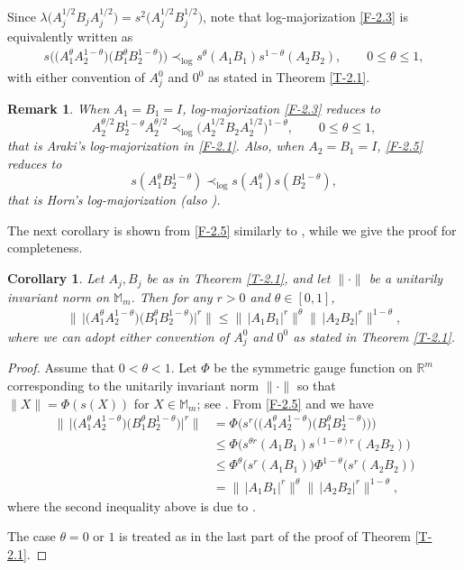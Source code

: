 \documentclass[11pt,reqno]{article}
\newtheorem{corollary}[theorem]{Corollary}
\newtheorem{remark}[theorem]{Remark}
\numberwithin{equation}{section}
\def\bR{\mathbb{R}}
\def\bM{\mathbb{M}}
\begin{document}
Since $\lambda\bigl(A_j^{1/2}B_jA_j^{1/2}\bigr)=s^2\bigl(A_j^{1/2}B_j^{1/2}\bigr)$, note that log-majorization
\eqref{F-2.3} is equivalently written as
\begin{align}\label{F-2.5}
s\bigl(\bigl(A_1^\theta A_2^{1-\theta}\bigr)\bigl(B_1^\theta B_2^{1-\theta}\bigr)\bigr)
\prec_{\log}s^\theta(A_1B_1)s^{1-\theta}(A_2B_2),
\qquad0\le\theta\le1,
\end{align}
with either convention of $A_j^0$ and $0^0$ as stated in Theorem \ref{T-2.1}.

\begin{remark}\label{R-2.2}\rm
When $A_1=B_1=I$, log-majorization \eqref{F-2.3} reduces to
\[
A_2^{\theta/2}B_2^{1-\theta} A_2^{\theta/2}\prec_{\log}\bigl(A_2^{1/2}B_2A_2^{1/2}\bigr)^{1-\theta},
\qquad0\le\theta\le1,
\]
that is Araki's log-majorization in \eqref{F-2.1}. Also, when $A_2=B_1=I$, \eqref{F-2.5} reduces to
\[
s(A_1^\theta B_2^{1-\theta})\prec_{\log}s(A_1^\theta)s(B_2^{1-\theta}),
\]
that is Horn's log-majorization \cite[p.\ 338]{MOA} (also \cite[Corollary 4.3.5]{Hi1}).
\end{remark}

The next corollary is shown from \eqref{F-2.5} similarly to \cite[Corollary 3.4]{Hi2}, while we give the proof
for completeness.

\begin{corollary}\label{C-2.3}
Let $A_j,B_j$ be as in Theorem \ref{T-2.1}, and let $\|\cdot\|$ be a unitarily invariant norm on $\bM_m$. Then
for any $r>0$ and $\theta\in[0,1]$,
\begin{align}\label{F-2.6}
\big\|\,\big|\bigl(A_1^\theta A_2^{1-\theta}\bigr)\bigl(B_1^\theta B_2^{1-\theta}\bigr)\big|^r\big\|
\le\big\|\,|A_1B_1|^r\big\|^\theta\big\|\,|A_2B_2|^r\big\|^{1-\theta},
\end{align}
where we can adopt either convention of $A_j^0$ and $0^0$ as stated in Theorem \ref{T-2.1}.
\end{corollary}

\begin{proof}
Assume that $0<\theta<1$. Let $\Phi$ be the symmetric gauge function on $\bR^m$ corresponding to the
unitarily invariant norm $\|\cdot\|$ so that $\|X\|=\Phi(s(X))$ for $X\in\bM_m$; see \cite[Theorem IV.2.1]{Bh}.
From \eqref{F-2.5} and \cite[Lemma 4.4.2]{Hi1} we have
\begin{align*}
\big\|\,\big|\bigl(A_1^\theta A_2^{1-\theta}\bigr)\bigl(B_1^\theta B_2^{1-\theta}\bigr)\big|^r\big\|
&=\Phi\bigl(s^r\bigl(\bigl(A_1^\theta A_2^{1-\theta}\bigr)\bigl(B_1^\theta B_2^{1-\theta}\bigr)\bigr)\bigr) \\
&\le\Phi\bigl(s^{\theta r}(A_1B_1)s^{(1-\theta)r}(A_2B_2)\bigr) \\
&\le\Phi^\theta\bigl(s^r(A_1B_1)\bigr)\Phi^{1-\theta}\bigl(s^r(A_2B_2)\bigr) \\
&=\big\|\,|A_1B_1|^r\big\|^\theta\big\|\,|A_2B_2|^r\big\|^{1-\theta},
\end{align*}
where the second inequality above is due to \cite[Theorem IV.1.6]{Bh}.

The case $\theta=0$ or $1$ is treated as in the last part of the proof of Theorem \ref{T-2.1}.
\end{proof}
\end{document}
